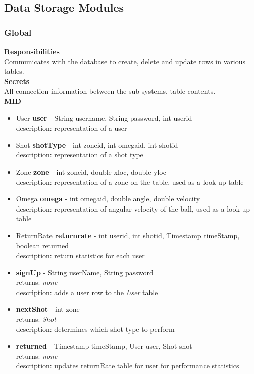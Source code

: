 \documentclass[11pt]{article}
\begin{document}
\subsection{Data Storage Modules}
\subsubsection*{Global}
\textbf{Responsibilities} \\
Communicates with the database to create, delete and update rows in various tables.  \\
\textbf{Secrets} \\
All connection information between the sub-systems, table contents.\\
\textbf{MID} \\
\begin{itemize}
\item User \textbf{user} - String user\textunderscore name, String password, int user\textunderscore id \\ description: representation of a user
\item Shot \textbf{shotType} - int zone\textunderscore id, int omega\textunderscore id, int shot\textunderscore id \\ description: representation of a shot type
\item Zone \textbf{zone} -  int zone\textunderscore id, double x\textunderscore loc, double y\textunderscore loc \\ description: representation of a zone on the table, used as a look up table
\item Omega \textbf{omega} - int omega\textunderscore id, double angle, double velocity \\ description: representation of angular velocity of the ball, used as a look up table
\item ReturnRate \textbf{return\textunderscore rate} - int user\textunderscore id, int shot\textunderscore id,  Timestamp timeStamp, boolean returned \\ description: return statistics for each user
\item \textbf{signUp} - String userName, String password \\ returns: \textit{none} \\ description: adds a user row to the \textit{User} table
\item \textbf{nextShot} - int zone \\ returns: \textit{Shot} \\ description: determines which shot type to perform
\item \textbf{returned} - Timestamp timeStamp, User user, Shot shot \\ returns: \textit{none} \\ description: updates returnRate table for user for performance statistics
\end{itemize}
\end{document}
